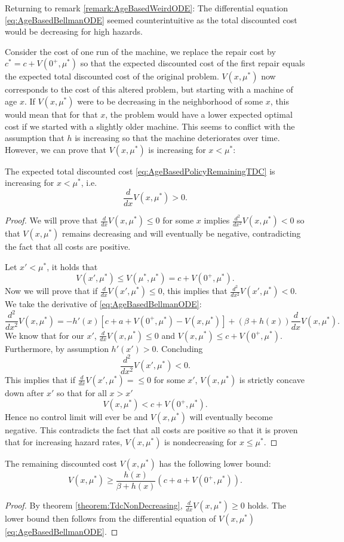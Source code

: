 	Returning to remark \ref{remark:AgeBasedWeirdODE}:
	The differential equation \eqref{eq:AgeBasedBellmanODE} seemed counterintuitive as the total discounted cost would be decreasing for high hazards.
	
	Consider the cost of one run of the machine, we replace the repair cost by $c^*=c+V(0^+,\mu^*)$ so that the expected discounted cost of the first repair equals the expected total discounted cost of the original problem.
	$V(x,\mu^*)$ now corresponds to the cost of this altered problem, but starting with a machine of age $x$.
	If $V(x,\mu^*)$ were to be decreasing in the neighborhood of some $x$, this would mean that for that $x$, the problem would have a lower expected optimal cost if we started with a slightly older machine.
	This seems to conflict with the assumption that $h$ is increasing so that the machine deteriorates over time.
	However, we can prove that $V(x,\mu^*)$ is increasing for $x<\mu^*$:

\begin{theorem}\label{theorem:TdcNonDecreasing}
	The expected total discounted cost \eqref{eq:AgeBasedPolicyRemainingTDC} is increasing for $x< \mu^*$, i.e.
	\[
	\frac{d}{dx}V(x,\mu^*)> 0.
	\]
	\begin{proof}
		We will prove that $\frac{d}{dx}V(x,\mu^*)\leq0$ for some $x$ implies $\frac{d^2}{dx^2}V(x,\mu^*)<0$ so that $V(x,\mu^*)$ remains decreasing and will eventually be negative, contradicting the fact that all costs are positive.
		
		Let $x'<\mu^*$, it holds that
		\[
		V(x',\mu^*)\leq V(\mu^*,\mu^*)=c+V(0^+,\mu^*).
		\]
		Now we will prove that if $\frac{d}{dx}V(x',\mu^*)\leq 0$, this implies that $\frac{d^2}{dx^2}V(x',\mu^*)<0$.
		We take the derivative of \eqref{eq:AgeBasedBellmanODE}:
		\[
		\frac{d^2}{dx^2}V(x,\mu^*)=-h'(x)[c+a+V(0^+,\mu^*)-V(x,\mu^*)]+(\beta+h(x))\frac{d}{dx}V(x,\mu^*).
		\]
		We know that for our $x'$, $\frac{d}{dx}V(x,\mu^*)\leq 0$ and $V(x,\mu^*)\leq c+V(0^+,\mu^*)$.
		Furthermore, by assumption $h'(x')>0$.
		Concluding
		\[
		\frac{d^2}{dx^2}V(x',\mu^*)<0.
		\]
		This implies that if $\frac{d}{dx}V(x',\mu^*)=\leq0$ for some $x'$, $V(x,\mu^*)$ is strictly concave down after $x'$ so that for all $x>x'$
		\[
		V(x,\mu^*)< c+V(0^+,\mu^*).
		\]
		Hence no control limit will ever be and $V(x,\mu^*)$ will eventually become negative.
		This contradicts the fact that all costs are positive so that it is proven that for increasing hazard rates, $V(x,\mu^*)$ is nondecreasing for $x\leq\mu^*$.
	\end{proof}
\end{theorem}

\begin{corollary}
	The remaining discounted cost $V(x,\mu^*)$ has the following lower bound:
	\[
	V(x,\mu^*)\geq\frac{h(x)}{\beta+ h(x)}(c+a+ V(0^+,\mu^*)).
	\]
	\begin{proof}
		By theorem \ref{theorem:TdcNonDecreasing}, $\frac{d}{dx}V(x,\mu^*)\geq 0$ holds.
		The lower bound then follows from the differential equation of $V(x,\mu^*)$ \ref{eq:AgeBasedBellmanODE}.
	\end{proof}
\end{corollary}